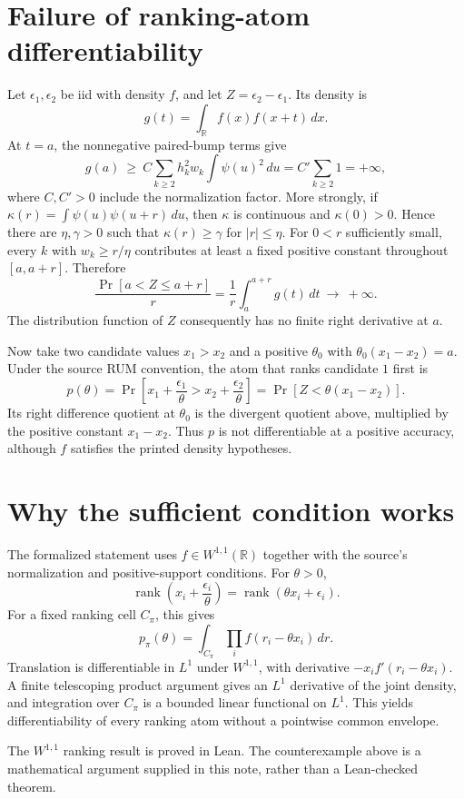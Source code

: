 \documentclass[11pt]{article}
\begin{document}
\section*{Failure of ranking-atom differentiability}

Let $\epsilon_1,\epsilon_2$ be iid with density $f$, and let
$Z=\epsilon_2-\epsilon_1$.  Its density is
\[
  g(t)=\int_{\mathbb R}f(x)f(x+t)\,dx.
\]
At $t=a$, the nonnegative paired-bump terms give
\[
  g(a)\ \geq\ C\sum_{k\geq2}
    h_k^2w_k\int\psi(u)^2\,du
  = C'\sum_{k\geq2}1=+\infty,
\]
where $C,C'>0$ include the normalization factor.  More strongly, if
$\kappa(r)=\int\psi(u)\psi(u+r)\,du$, then $\kappa$ is continuous and
$\kappa(0)>0$.  Hence there are $\eta,\gamma>0$ such that
$\kappa(r)\geq\gamma$ for $|r|\leq\eta$.  For $0<r$ sufficiently small,
every $k$ with $w_k\geq r/\eta$ contributes at least a fixed positive
constant throughout $[a,a+r]$.  Therefore
\[
  \frac{\Pr[a<Z\leq a+r]}{r}
  =\frac1r\int_a^{a+r}g(t)\,dt
  \ \longrightarrow\ +\infty.
\]
The distribution function of $Z$ consequently has no finite right derivative
at $a$.

Now take two candidate values $x_1>x_2$ and a positive $\theta_0$ with
$\theta_0(x_1-x_2)=a$.  Under the source RUM convention, the atom that ranks
candidate $1$ first is
\[
  p(\theta)=
    \Pr\left[x_1+\frac{\epsilon_1}{\theta}>
               x_2+\frac{\epsilon_2}{\theta}\right]
    =\Pr[Z<\theta(x_1-x_2)].
\]
Its right difference quotient at $\theta_0$ is the divergent quotient above,
multiplied by the positive constant $x_1-x_2$.  Thus $p$ is not differentiable
at a positive accuracy, although $f$ satisfies the printed density hypotheses.

\section*{Why the sufficient condition works}

The formalized statement uses $f\in W^{1,1}(\mathbb R)$ together with the
source's normalization and positive-support conditions. For $\theta>0$,
\[
  \operatorname{rank}\left(x_i+\frac{\epsilon_i}{\theta}\right)
  =\operatorname{rank}(\theta x_i+\epsilon_i).
\]
For a fixed ranking cell $C_\pi$, this gives
\[
  p_\pi(\theta)=\int_{C_\pi}\prod_i f(r_i-\theta x_i)\,dr.
\]
Translation is differentiable in $L^1$ under $W^{1,1}$, with derivative
$-x_i f'(r_i-\theta x_i)$.  A finite telescoping product argument gives an
$L^1$ derivative of the joint density, and integration over $C_\pi$ is a
bounded linear functional on $L^1$.  This yields differentiability of every
ranking atom without a pointwise common envelope.

The $W^{1,1}$ ranking result is proved in Lean. The counterexample above is a
mathematical argument supplied in this note, rather than a Lean-checked theorem.
\end{document}
